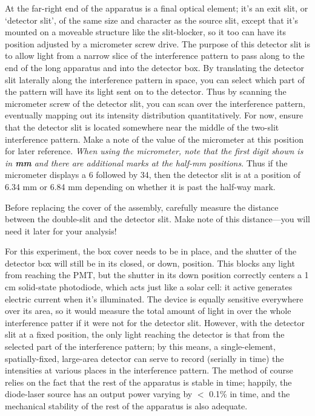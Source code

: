 \documentclass[11pt]{article}
\begin{document}

At the far-right end of the apparatus is a final optical element; it’s an exit
slit, or ‘detector slit’, of the same size and character as the source slit,
except that it’s mounted on a moveable structure like the slit-blocker, so it
too can have its position adjusted by a micrometer screw drive. The purpose of
this detector slit is to allow light from a narrow slice of the interference
pattern to pass along to the end of the long apparatus and into the detector
box. By translating the detector slit laterally along the interference pattern
in space, you can select which part of the pattern will have its light sent on
to the detector. Thus by scanning the micrometer screw of the detector slit, you
can scan over the interference pattern, eventually mapping out its intensity
distribution quantitatively. For now, ensure that the detector slit is located
somewhere near the middle of the two-slit interference pattern. Make a note of the
value of the micrometer at this position for later reference. \textit{When using the 
micrometer, note that the first digit shown is in \textbf{mm} and there are additional 
marks at the half-mm positions}. Thus if the micrometer displays a 6 followed by 34, 
then the detector slit is at a position of 6.34 mm or 6.84 mm depending on whether
it is past the half-way mark.

Before replacing the cover of the assembly, carefully measure the distance between
the double-slit and the detector slit. Make note of this distance---you will need it later for your analysis!

\vspace{5mm}


For this experiment, the box cover needs to be in place, and the shutter of the
detector box will still be in its closed, or down, position. This blocks any
light from reaching the PMT, but the shutter in its down position correctly
centers a 1 cm solid-state photodiode, which acts just like a solar cell: it
active generates electric current when it’s illuminated. The device is
equally sensitive everywhere over its area, so it would measure the total amount
of light in over the whole interference patter if it were not for the detector slit.
However, with the detector slit at a fixed position, the only light reaching the 
detector is that from the selected part of the interference pattern; by this means, a single-element, spatially-fixed, large-area detector can serve to record (serially in
time) the intensities at various places in the interference pattern. The method
of course relies on the fact that the rest of the apparatus is stable in time;
happily, the diode-laser source has an output power varying by $<$ 0.1\% in time,
and the mechanical stability of the rest of the apparatus is also adequate.
\end{document}
